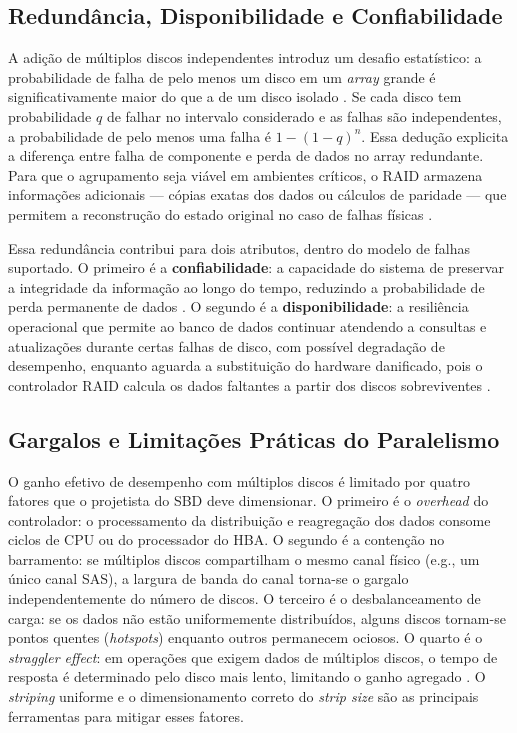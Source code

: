 \documentclass[titlepage]{article}
\begin{document}
\subsection{Redundância, Disponibilidade e Confiabilidade}
A adição de múltiplos discos independentes introduz um desafio estatístico: a probabilidade de falha de pelo menos um disco em um \textit{array} grande é significativamente maior do que a de um disco isolado \cite{silberschatz2020}. Se cada disco tem probabilidade $q$ de falhar no intervalo considerado e as falhas são independentes, a probabilidade de pelo menos uma falha é $1-(1-q)^n$. Essa dedução explicita a diferença entre falha de componente e perda de dados no array redundante. Para que o agrupamento seja viável em ambientes críticos, o RAID armazena informações adicionais --- cópias exatas dos dados ou cálculos de paridade --- que permitem a reconstrução do estado original no caso de falhas físicas \cite{silberschatz2020}.

Essa redundância contribui para dois atributos, dentro do modelo de falhas suportado. O primeiro é a \textbf{confiabilidade}: a capacidade do sistema de preservar a integridade da informação ao longo do tempo, reduzindo a probabilidade de perda permanente de dados \cite{silberschatz2020}. O segundo é a \textbf{disponibilidade}: a resiliência operacional que permite ao banco de dados continuar atendendo a consultas e atualizações durante certas falhas de disco, com possível degradação de desempenho, enquanto aguarda a substituição do hardware danificado, pois o controlador RAID calcula os dados faltantes a partir dos discos sobreviventes \cite{silberschatz2020}.

\subsection{Gargalos e Limitações Práticas do Paralelismo}
O ganho efetivo de desempenho com múltiplos discos é limitado por quatro fatores que o projetista do SBD deve dimensionar. O primeiro é o \textit{overhead} do controlador: o processamento da distribuição e reagregação dos dados consome ciclos de CPU ou do processador do HBA. O segundo é a contenção no barramento: se múltiplos discos compartilham o mesmo canal físico (e.g., um único canal SAS), a largura de banda do canal torna-se o gargalo independentemente do número de discos. O terceiro é o desbalanceamento de carga: se os dados não estão uniformemente distribuídos, alguns discos tornam-se pontos quentes (\textit{hotspots}) enquanto outros permanecem ociosos. O quarto é o \textit{straggler effect}: em operações que exigem dados de múltiplos discos, o tempo de resposta é determinado pelo disco mais lento, limitando o ganho agregado \cite{garciamolina2009}. O \textit{striping} uniforme e o dimensionamento correto do \textit{strip size} são as principais ferramentas para mitigar esses fatores.
\end{document}
